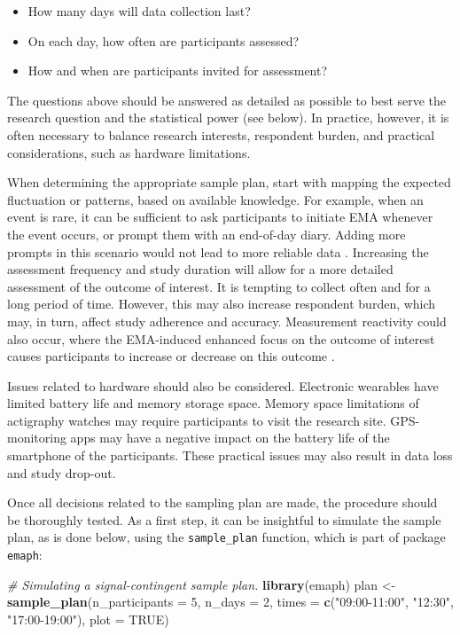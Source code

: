 \documentclass[]{book}
\newenvironment{Shaded}{\begin{snugshade}}{\end{snugshade}}
\newcommand{\KeywordTok}[1]{\textcolor[rgb]{0.13,0.29,0.53}{\textbf{#1}}}
\newcommand{\DataTypeTok}[1]{\textcolor[rgb]{0.13,0.29,0.53}{#1}}
\newcommand{\DecValTok}[1]{\textcolor[rgb]{0.00,0.00,0.81}{#1}}
\newcommand{\StringTok}[1]{\textcolor[rgb]{0.31,0.60,0.02}{#1}}
\newcommand{\CommentTok}[1]{\textcolor[rgb]{0.56,0.35,0.01}{\textit{#1}}}
\newcommand{\OtherTok}[1]{\textcolor[rgb]{0.56,0.35,0.01}{#1}}
\newcommand{\NormalTok}[1]{#1}
\providecommand{\tightlist}{%
  \setlength{\itemsep}{0pt}\setlength{\parskip}{0pt}}
\begin{document}
\begin{itemize}
\tightlist
\item
  How many days will data collection last?
\item
  On each day, how often are participants assessed?
\item
  How and when are participants invited for assessment?
\end{itemize}

The questions above should be answered as detailed as possible to best
serve the research question and the statistical power (see below). In
practice, however, it is often necessary to balance research interests,
respondent burden, and practical considerations, such as hardware
limitations.

When determining the appropriate sample plan, start with mapping the
expected fluctuation or patterns, based on available knowledge. For
example, when an event is rare, it can be sufficient to ask participants
to initiate EMA whenever the event occurs, or prompt them with an
end-of-day diary. Adding more prompts in this scenario would not lead to
more reliable data \citep{Piasecki2007}. Increasing the assessment
frequency and study duration will allow for a more detailed assessment
of the outcome of interest. It is tempting to collect often and for a
long period of time. However, this may also increase respondent burden,
which may, in turn, affect study adherence and accuracy. Measurement
reactivity could also occur, where the EMA-induced enhanced focus on the
outcome of interest causes participants to increase or decrease on this
outcome \citep{Hufford2002, VanBallegooijen2016}.

Issues related to hardware should also be considered. Electronic
wearables have limited battery life and memory storage space. Memory
space limitations of actigraphy watches may require participants to
visit the research site. GPS-monitoring apps may have a negative impact
on the battery life of the smartphone of the participants. These
practical issues may also result in data loss and study drop-out.

Once all decisions related to the sampling plan are made, the procedure
should be thoroughly tested. As a first step, it can be insightful to
simulate the sample plan, as is done below, using the
\texttt{sample\_plan} function, which is part of package \texttt{emaph}:

\begin{Shaded}
\begin{Highlighting}[]
\CommentTok{# Simulating a signal-contingent sample plan.}
\KeywordTok{library}\NormalTok{(emaph)}
\NormalTok{plan <-}\StringTok{ }\KeywordTok{sample_plan}\NormalTok{(}\DataTypeTok{n_participants =} \DecValTok{5}\NormalTok{,}
                    \DataTypeTok{n_days =} \DecValTok{2}\NormalTok{,}
                    \DataTypeTok{times =} \KeywordTok{c}\NormalTok{(}\StringTok{"09:00-11:00"}\NormalTok{, }\StringTok{"12:30"}\NormalTok{, }\StringTok{"17:00-19:00"}\NormalTok{),}
                    \DataTypeTok{plot =} \OtherTok{TRUE}\NormalTok{)}
\end{Highlighting}
\end{Shaded}
\end{document}
